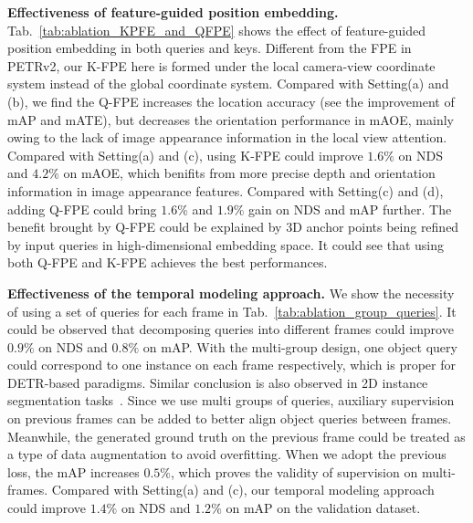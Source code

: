 \documentclass[10pt,twocolumn,letterpaper]{article}
\begin{document}
\vspace{2mm}
\noindent\textbf{Effectiveness of feature-guided position embedding.}
Tab.~\ref{tab:ablation_KPFE_and_QFPE} shows the effect of feature-guided position embedding in both queries and keys. 
Different from the FPE in PETRv2\cite{paszke2019pytorch}, our K-FPE here is formed under the local camera-view coordinate system instead of the global coordinate system. Compared with Setting(a) and (b), we find the Q-FPE increases the location accuracy (see the improvement of mAP and mATE), but decreases the orientation performance in mAOE, mainly owing to the lack of image appearance information in the local view attention. Compared with Setting(a) and (c), using K-FPE could improve $1.6\%$ on NDS and $4.2\%$ on mAOE, which benifits from more precise depth and orientation information in image appearance features. Compared with Setting(c) and (d), adding Q-FPE could bring $1.6\%$ and $1.9\%$ gain on NDS and mAP further. The benefit brought by Q-FPE could be explained by 3D anchor points being refined by input queries in high-dimensional embedding space. It could see that using both Q-FPE and K-FPE achieves the best performances. 


\vspace{2mm}
\noindent\textbf{Effectiveness of the temporal modeling approach.} We show the necessity of using a set of queries for each frame in Tab.~\ref{tab:ablation_group_queries}. It could be observed that decomposing queries into different frames could improve $0.9\%$ on NDS and $0.8\%$ on mAP. With the multi-group design, one object query could correspond to one instance on each frame respectively, which 
is proper for DETR-based paradigms. Similar conclusion is also observed in 2D instance segmentation tasks~\cite{wu2021seqformer}. Since we use multi groups of queries, auxiliary supervision on previous frames can be added to better align object queries between frames. Meanwhile, the generated ground truth on the previous frame could be treated as a type of data augmentation to avoid overfitting. When we 
adopt the previous loss, the mAP increases $0.5\%$, which proves the validity of supervision on multi-frames. Compared with Setting(a) and (c), our temporal modeling approach could improve $1.4\%$ on NDS and $1.2\%$ on mAP on the validation dataset. 
\end{document}
